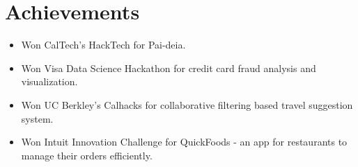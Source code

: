 \newcommand\textlcsc[1]{\textsc{\MakeTextLowercase{#1}}}
\section{Achievements}
\begin{itemize}
\item Won CalTech's HackTech for Pai-deia.
\item Won Visa Data Science Hackathon for credit card fraud analysis and visualization.
\item Won UC Berkley's Calhacks for collaborative filtering based travel suggestion system.
\item Won Intuit Innovation Challenge for QuickFoods - an app for restaurants to manage their orders efficiently. 
\end{itemize}
